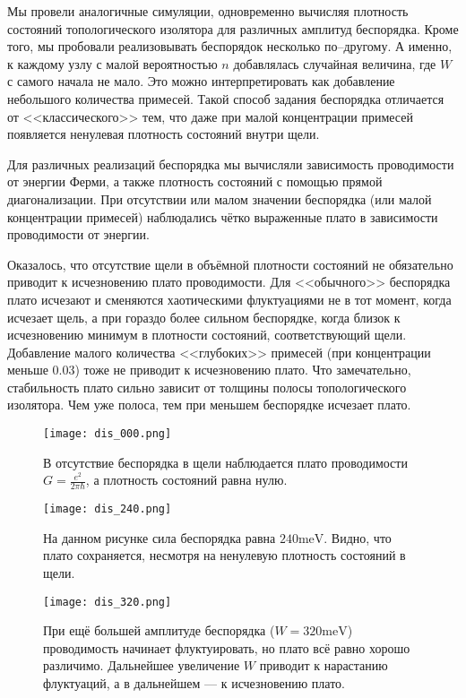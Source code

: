 Мы провели аналогичные симуляции, одновременно вычисляя плотность состояний топологического
изолятора для различных амплитуд беспорядка. Кроме того, мы пробовали реализовывать 
беспорядок несколько по--другому. А именно, к каждому узлу с малой 
вероятностью $n$ добавлялась случайная величина, где $W$ с самого начала не мало. Это можно
интерпретировать как добавление небольшого количества примесей. Такой способ задания беспорядка
отличается от <<классического>> тем, что даже при малой концентрации примесей появляется
ненулевая плотность состояний внутри щели. 

Для различных реализаций беспорядка мы вычисляли зависимость проводимости от энергии Ферми, а
также плотность состояний с помощью прямой диагонализации. При отсутствии или малом значении 
беспорядка (или малой концентрации примесей) наблюдались 
чётко выраженные плато в зависимости проводимости от энергии.

Оказалось, что отсутствие щели в объёмной плотности состояний не обязательно приводит 
к исчезновению плато проводимости. Для <<обычного>> беспорядка плато исчезают
и сменяются хаотическими флуктуациями не в тот момент, когда исчезает щель, а при гораздо
более сильном беспорядке, когда близок к исчезновению минимум в плотности состояний,
соответствующий щели. Добавление малого количества <<глубоких>> примесей (при концентрации 
меньше $0.03$) тоже не приводит к исчезновению плато. Что замечательно, стабильность
плато сильно зависит от толщины полосы топологического изолятора. Чем уже полоса, тем 
при меньшем беспорядке исчезает плато. 
\begin{figure}[h]
    \centering
    \texttt{[image: dis\_000.png]}
    \caption{В отсутствие беспорядка 
             в щели наблюдается плато проводимости $G = \frac{e^2}{2\pi\hbar}$, 
             а плотность состояний равна нулю. 
             }
\end{figure}

\begin{figure}[h]
    \centering
    \texttt{[image: dis\_240.png]}
    \caption{На данном рисунке сила беспорядка равна $240 \mathrm{meV}$. Видно, что плато 
             сохраняется, несмотря на ненулевую плотность состояний в щели.}
\end{figure}

\begin{figure}[h]
    \centering
    \texttt{[image: dis\_320.png]}
    \caption{При ещё большей амплитуде беспорядка ($W = 320\mathrm{meV}$) проводимость начинает
             флуктуировать, но плато всё равно хорошо различимо. Дальнейшее увеличение $W$ 
             приводит к нарастанию флуктуаций, а в дальнейшем --- к исчезновению плато.}
\end{figure}

%
\clearpage

